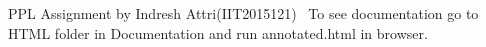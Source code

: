 P\+PL Assignment by Indresh Attri(\+I\+I\+T2015121)~\newline
 To see documentation go to H\+T\+ML folder in Documentation and run annotated.\+html in browser. 